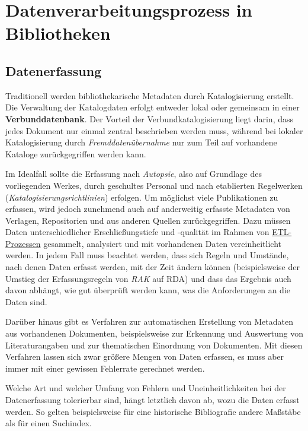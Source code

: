 \documentclass[
  11pt,
  letterpaper,
  DIV=11,
  twoside]{scrreprt}
\begin{document}
\section{Datenverarbeitungsprozess in
Bibliotheken}\label{datenverarbeitungsprozess-in-bibliotheken}

\subsection{Datenerfassung}\label{datenerfassung}

Traditionell werden bibliothekarische Metadaten durch Katalogisierung
erstellt. Die Verwaltung der Katalogdaten erfolgt entweder lokal oder
gemeinsam in einer \textbf{Verbunddatenbank}. Der Vorteil der
Verbundkatalogisierung liegt darin, dass jedes Dokument nur einmal
zentral beschrieben werden muss, während bei lokaler Katalogisierung
durch \emph{Fremddatenübernahme} nur zum Teil auf vorhandene Kataloge
zurückgegriffen werden kann.

Im Idealfall sollte die Erfassung nach \emph{Autopsie}, also auf
Grundlage des vorliegenden Werkes, durch geschultes Personal und nach
etablierten Regelwerken (\emph{Katalogisierungsrichtlinien}) erfolgen.
Um möglichst viele Publikationen zu erfassen, wird jedoch zunehmend auch
auf anderweitig erfasste Metadaten von Verlagen, Repositorien und aus
anderen Quellen zurückgegriffen. Dazu müssen Daten unterschiedlicher
Erschließungstiefe und -qualität im Rahmen von
\hyperref[etl-prozess]{ETL-Prozessen} gesammelt, analysiert und mit
vorhandenen Daten vereinheitlicht werden. In jedem Fall muss beachtet
werden, dass sich Regeln und Umstände, nach denen Daten erfasst werden,
mit der Zeit ändern können (beispielsweise der Umstieg der
Erfassungsregeln von \emph{RAK} auf {RDA}) und dass das Ergebnis auch
davon abhängt, wie gut überprüft werden kann, was die Anforderungen an
die Daten sind.

Darüber hinaus gibt es Verfahren zur automatischen Erstellung von
Metadaten aus vorhandenen Dokumenten, beispielsweise zur Erkennung und
Auswertung von Literaturangaben und zur thematischen Einordnung von
Dokumenten. Mit diesen Verfahren lassen sich zwar größere Mengen von
Daten erfassen, es muss aber immer mit einer gewissen Fehlerrate
gerechnet werden.

Welche Art und welcher Umfang von Fehlern und Uneinheitlichkeiten bei
der Datenerfassung tolerierbar sind, hängt letztlich davon ab, wozu die
Daten erfasst werden. So gelten beispielsweise für eine historische
Bibliografie andere Maßstäbe als für einen Suchindex.
\end{document}
